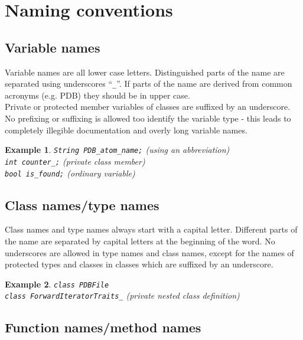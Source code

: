\documentclass[a4]{article}
\newtheorem{example}{Example}
\begin{document}
\section{Naming conventions}

\subsection{Variable names}

Variable names are all lower case letters. Distinguished parts of the name are
separated using underscores ``{\tt \_}''. If parts of the name are derived
from common acronyms (e.g. PDB) they should be in upper case.\\
Private or protected member variables of classes are suffixed by an
underscore.\\
No prefixing or suffixing is allowed too identify the variable type - this
leads to completely illegible documentation and overly long variable names.\\
\begin{example}
{\tt String PDB\_atom\_name;} (using an abbreviation)\\
{\tt int counter\_;} (private class member)\\
{\tt bool is\_found;} (ordinary variable)
\end{example}

\subsection{Class names/type names}

Class names and type names always start with a capital letter. Different parts
of the name are separated by capital letters at the beginning of the word. No
underscores are allowed in type names and class names, except for the names of
protected types and classes in classes which are suffixed by an underscore.
\begin{example}
{\tt class PDBFile}\\
{\tt class ForwardIteratorTraits\_} (private nested class definition)\\
\end{example}

\subsection{Function names/method names}
\end{document}
